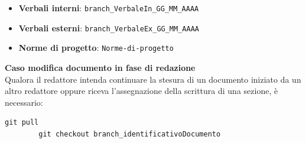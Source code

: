 \documentclass{article}
\begin{document}
    \begin{itemize}
        \item \textbf{Verbali interni}: \verb|branch_VerbaleIn_GG_MM_AAAA|
        \item \textbf{Verbali esterni}: \verb|branch_VerbaleEx_GG_MM_AAAA|
        \item \textbf{Norme di progetto}: \verb|Norme-di-progetto|
    \end{itemize}

    \textbf{Caso modifica documento in fase di redazione}\\
   Qualora il redattore intenda continuare la stesura di un documento iniziato da un altro redattore oppure riceva l'assegnazione della scrittura di una sezione, è necessario:

        \begin{lstlisting}[style=code]
        git pull
        git checkout branch_identificativoDocumento

        \end{lstlisting}
\end{document}
